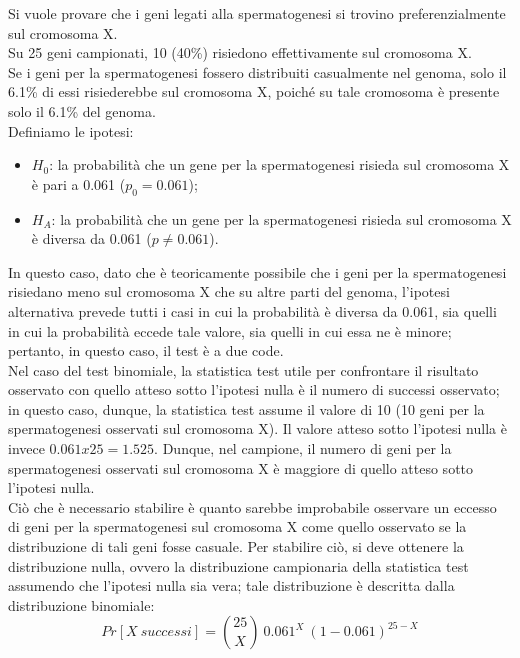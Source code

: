 \documentclass[10pt, draft]{book}
\newcommand{\tightlist}{%
\setlength{\itemsep}{1pt}\setlength{\parskip}{0pt}\setlength{\parsep}{0pt}}
\newcounter{example}[section]
\begin{document}
\begin{example}
    Si vuole provare che i geni legati alla spermatogenesi si trovino preferenzialmente sul cromosoma X.
    \\
    Su 25 geni campionati, 10 (40\%) risiedono effettivamente sul cromosoma X.
    \\
    Se i geni per la spermatogenesi fossero distribuiti casualmente nel genoma, solo il 6.1\% di essi risiederebbe sul cromosoma X, poiché su tale cromosoma è presente solo il 6.1\% del genoma.
    \\
    Definiamo le ipotesi:
    \begin{itemize} \tightlist
    \item $H_0$: la probabilità che un gene per la spermatogenesi risieda sul cromosoma X è pari a 0.061 ($p_0 = 0.061$);
    \item $H_A$: la probabilità che un gene per la spermatogenesi risieda sul cromosoma X è diversa da 0.061 ($p\ne 0.061$).
    \end{itemize}
    In questo caso, dato che è teoricamente possibile che i geni per la spermatogenesi risiedano meno sul cromosoma X che su altre parti del genoma, l'ipotesi alternativa prevede tutti i casi in cui la probabilità è diversa da 0.061, sia quelli in cui la probabilità eccede tale valore, sia quelli in cui essa ne è minore; pertanto, in questo caso, il test è a due code.
    \\
    Nel caso del test binomiale, la statistica test utile per confrontare il risultato osservato con quello atteso sotto l'ipotesi nulla è il numero di successi osservato; in questo caso, dunque, la statistica test assume il valore di 10 (10 geni per la spermatogenesi osservati sul cromosoma X). Il valore atteso sotto l'ipotesi nulla è invece $0.061 x 25 = 1.525$. Dunque, nel campione, il numero di geni per la spermatogenesi osservati sul cromosoma X è maggiore di quello atteso sotto l'ipotesi nulla.
    \\
    Ciò che è necessario stabilire è quanto sarebbe improbabile osservare un eccesso di geni per la spermatogenesi sul cromosoma X come quello osservato se la distribuzione di tali geni fosse casuale. Per stabilire ciò, si deve ottenere la distribuzione nulla, ovvero la distribuzione campionaria della statistica test assumendo che l'ipotesi nulla sia vera; tale distribuzione è descritta dalla distribuzione binomiale:
    \begin{equation}
    Pr[X \ successi] = \binom{25}{X}\ 0.061^X \ (1-0.061)^{25 - X}
    \end{equation}

\end{example}
\end{document}
